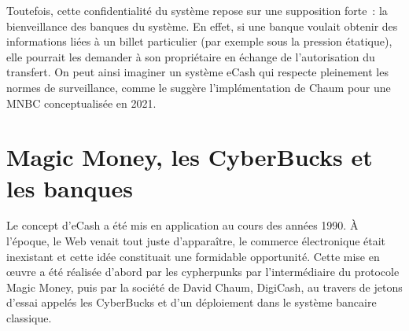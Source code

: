 Toutefois, cette confidentialité du système repose sur une supposition forte~: la bienveillance des banques du système. En effet, si une banque voulait obtenir des informations liées à un billet particulier (par exemple sous la pression étatique), elle pourrait les demander à son propriétaire en échange de l'autorisation du transfert. On peut ainsi imaginer un système eCash qui respecte pleinement les normes de surveillance, comme le suggère l'implémentation de Chaum pour une MNBC conceptualisée en 2021.


\section*{Magic Money, les CyberBucks et les banques} %

Le concept d'eCash a été mis en application au cours des années 1990. À l'époque, le Web venait tout juste d'apparaître, le commerce électronique était inexistant et cette idée constituait une formidable opportunité. Cette mise en œuvre a été réalisée d'abord par les cypherpunks par l'intermédiaire du protocole Magic Money, puis par la société de David Chaum, DigiCash, au travers de jetons d'essai appelés les CyberBucks et d'un déploiement dans le système bancaire classique. %

